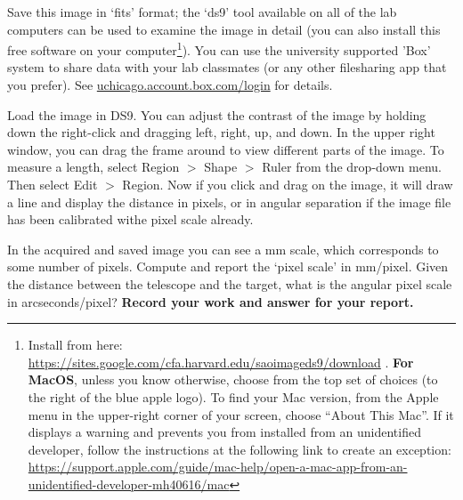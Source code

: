 \begin{steps}
	\item Save this image in ‘fits’ format; the ‘ds9’ tool available on all of the lab
	computers can be used to examine the image in detail (you can also install this free software on your computer\footnote{Install from here: \url{https://sites.google.com/cfa.harvard.edu/saoimageds9/download} . \textbf{For MacOS}, unless you know otherwise, choose from the top set of choices (to the right of
		the blue apple logo). To find your Mac version, from the Apple menu in the upper-right corner of your screen,
		choose “About This Mac”. If it displays a warning and prevents you from installed from an unidentified developer, follow the instructions at the following link to create an exception: \url{https://support.apple.com/guide/mac-help/open-a-mac-app-from-an-unidentified-developer-mh40616/mac}}). You can use the university supported
	’Box’ system to share data with your lab classmates (or any other filesharing app that you prefer). See \url{uchicago.account.box.com/login}
	for details.
	
%	

	\item Load the image in DS9. You can adjust the contrast of the image by holding down the right-click and dragging left, right, up, and down. In the upper right window, you can drag the frame around to view different parts of the image. To measure a length, select Region $>$ Shape $>$ Ruler from the drop-down menu. Then select Edit $>$ Region. Now if you click and drag on the image, it will draw a line and display the distance in pixels, or in angular separation if the image file has been calibrated withe pixel scale already.
	
	\item In the acquired and saved image you can see a mm scale, which corresponds to some number
	of pixels. Compute and report the ‘pixel scale’ in mm/pixel. Given the distance between the
	telescope and the target, what is the angular pixel scale in arcseconds/pixel? \textbf{Record your work and answer for your report.}
	

\end{steps}
